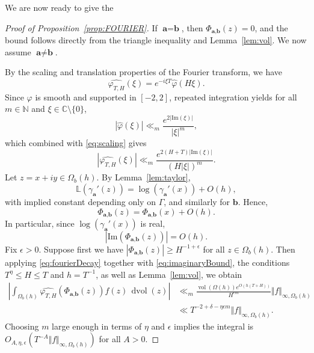 \documentclass[12pt,letterpaper]{amsart}
\theoremstyle{plain}
\theoremstyle{definition}
\theoremstyle{remark}
\newcommand{\Aa}{\textbf{a}}
\newcommand{\Bb}{\textbf{b}}
\newcommand{\CC}{\mathbb{C}}
\DeclareMathOperator{\dvol}{dvol}
\DeclareMathOperator{\vol}{vol}
\begin{document}
We are now ready to give the

\begin{proof}[Proof of Proposition~\ref{prop:FOURIER}]
If $\Aa = \Bb$, then $\Phi_{\Aa,\Bb}(z) = 0$, and the bound follows directly from the triangle inequality and Lemma~\ref{lem:vol}. We now assume $\Aa \neq \Bb$.

By the scaling and translation properties of the Fourier transform, we have
\begin{equation}\label{eq:scaling}
\widehat{\varphi_{T,H}}(\xi) = e^{-i\xi T} \widehat{\varphi}(H\xi).
\end{equation}
Since $\varphi$ is smooth and supported in $[-2,2]$, repeated integration yields for all $m \in \mathbb{N}$ and $\xi \in \CC \setminus \{0\}$,
\[
|\widehat{\varphi}(\xi)| \ll_m \frac{e^{2 |\mathrm{Im}(\xi)|}}{|\xi|^m},
\]
which combined with \eqref{eq:scaling} gives
\begin{equation}\label{eq:fourierDecay}
|\widehat{\varphi_{T,H}}(\xi)| \ll_m \frac{e^{2(H+T)|\mathrm{Im}(\xi)|}}{(H |\xi|)^m}. 
\end{equation}
Let $z = x + iy \in \Omega_b(h)$. By Lemma~\ref{lem:taylor},
\[
\mathbb{L}(\gamma_{\Aa}'(z)) = \log(\gamma_{\Aa}'(x)) + O(h),
\]
with implied constant depending only on $\Gamma$, and similarly for $\Bb$. Hence,
\begin{equation}\label{eq:phiBound}
\Phi_{\Aa,\Bb}(z) = \Phi_{\Aa,\Bb}(x) + O(h).
\end{equation}
In particular, since $\log(\gamma_{\Aa}'(x))$ is real,
\begin{equation}\label{eq:imaginaryBound}
|\mathrm{Im}(\Phi_{\Aa,\Bb}(z))| = O(h). 
\end{equation}
Fix $\epsilon > 0$. Suppose first we have $|\Phi_{\Aa,\Bb}(z)| \ge H^{-1+\epsilon}$ for all $z \in \Omega_b(h)$. Then applying \eqref{eq:fourierDecay} together with \eqref{eq:imaginaryBound}, the conditions $T^\eta \le H \le T$ and $h= T^{-1}$, as well as Lemma~\ref{lem:vol}, we obtain
\begin{align*}
\left| \int_{\Omega_b(h)} \widehat{\varphi_{T,H}}(\Phi_{\Aa,\Bb}(z)) f(z)\, \dvol(z) \right| &\ll_m \frac{\vol(\Omega(h)) e^{O(h(T+H))}}{H^{\epsilon m}} \Vert f \Vert_{\infty, \Omega_b(h)}\\
&\ll T^{-2+\delta - \eta \epsilon m} \Vert f \Vert_{\infty, \Omega_b(h)}.
\end{align*}
Choosing $m$ large enough in terms of $\eta$ and $\epsilon$ implies the integral is $O_{A,\eta,\epsilon}(T^{-A} \Vert f \Vert_{\infty, \Omega_b(h)})$ for all $A > 0$.


\end{proof}
\end{document}

